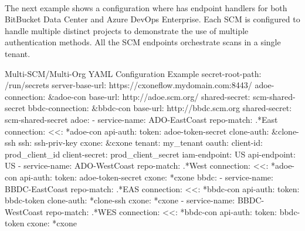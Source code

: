 \pagebreak
\noindent\\The next example shows a configuration where \cxoneflow has endpoint handlers for both
BitBucket Data Center and Azure DevOps Enterprise.  Each SCM is configured to handle multiple distinct
projects to demonstrate the use of multiple authentication methods.  All the SCM endpoints
orchestrate scans in a single \cxone tenant.

\begin{code}{Multi-SCM/Multi-Org YAML Configuration Example}{}{}
secret-root-path: /run/secrets
server-base-url: https://cxoneflow.mydomain.com:8443/
adoe-connection: &adoe-con
    base-url: http://adoe.scm.org/
    shared-secret: scm-shared-secret
bbdc-connection: &bbdc-con
    base-url: http://bbdc.scm.org
    shared-secret: scm-shared-secret
adoe:
    - service-name: ADO-EastCoast
        repo-match: .*East
        connection:
        <<: *adoe-con
        api-auth: 
            token: adoe-token-secret
        clone-auth: &clone-ssh
            ssh: ssh-priv-key
        cxone: &cxone
        tenant: my_tenant
        oauth:
            client-id: prod_client_id
            client-secret: prod_client_secret
        iam-endpoint: US
        api-endpoint: US
    - service-name: ADO-WestCoast
        repo-match: .*West
        connection:
        <<: *adoe-con
        api-auth:
            token: adoe-token-secret
        cxone: *cxone
bbdc:
    - service-name: BBDC-EastCoast
        repo-match: .*EAS
        connection:
        <<: *bbdc-con
        api-auth: 
            token: bbdc-token
        clone-auth: *clone-ssh
        cxone: *cxone
    - service-name: BBDC-WestCoast
        repo-match: .*WES
        connection:
        <<: *bbdc-con
        api-auth:
            token: bbdc-token
        cxone: *cxone
\end{code}
